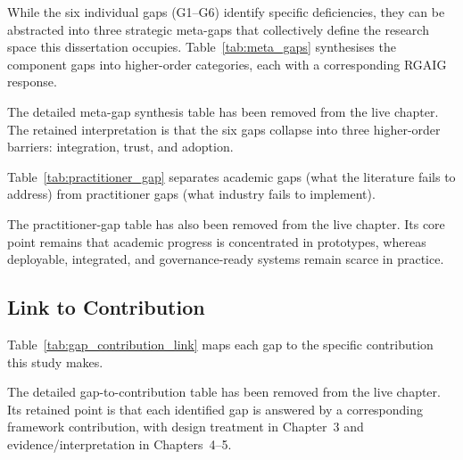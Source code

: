 While the six individual gaps (G1--G6) identify specific deficiencies, they can be abstracted into three strategic meta-gaps that collectively define the research space this dissertation occupies. Table~\ref{tab:meta_gaps} synthesises the component gaps into higher-order categories, each with a corresponding RGAIG response.

\noindent The detailed meta-gap synthesis table has been removed from the live chapter. The retained interpretation is that the six gaps collapse into three higher-order barriers: integration, trust, and adoption.


Table~\ref{tab:practitioner_gap} separates academic gaps (what the literature fails to address) from practitioner gaps (what industry fails to implement).

\noindent The practitioner-gap table has also been removed from the live chapter. Its core point remains that academic progress is concentrated in prototypes, whereas deployable, integrated, and governance-ready systems remain scarce in practice.

\subsection{Link to Contribution}

Table~\ref{tab:gap_contribution_link} maps each gap to the specific contribution this study makes.

\noindent The detailed gap-to-contribution table has been removed from the live chapter. Its retained point is that each identified gap is answered by a corresponding framework contribution, with design treatment in Chapter~3 and evidence/interpretation in Chapters~4--5.

